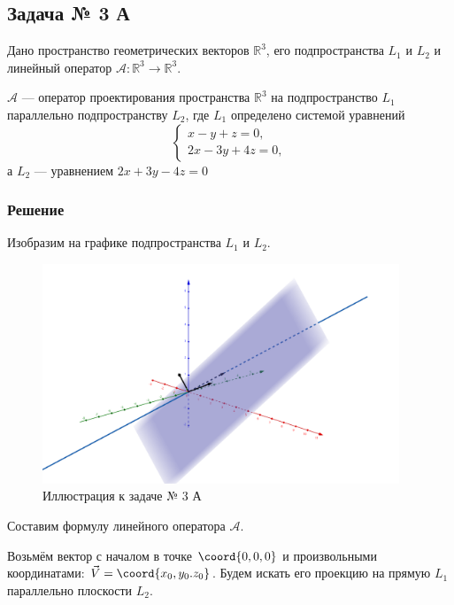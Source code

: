 \subsection{Задача № 3 А}

\newcommand{\mRRR}{\mathbb{R}^3}
\newcommand{\opA}{\mathcal{A}}
\newcommand{\matA}{\mathrm{A}}
\newcommand{\matP}{\mathrm{P}}


Дано пространство геометрических векторов \(\mRRR\),
его подпространства \(L_1\) и \(L_2\) и линейный оператор
\(\opA : \mRRR \to \mRRR\).

\(\opA\) --- оператор проектирования пространства \(\mRRR\)
на подпространство \(L_1\) параллельно подпространству \(L_2\),
где \(L_1\) определено системой уравнений
\[
  \begin{cases}
    x - y + z = 0, \\
    2x - 3y + 4z = 0,
  \end{cases}
\]
а \(L_2\) --- уравнением \(2x + 3y - 4z=0\)

\subsubsection{Решение}

Изобразим на графике подпространства \(L_1\) и \(L_2\).

\begin{figure}[!htbp]
  \centering
  \includegraphics[width=0.95\textwidth]{./img/03-a-1.png}
  \caption{Иллюстрация к задаче № 3 А}
\end{figure}

Составим формулу линейного оператора \(\opA\).

Возьмём вектор с началом в точке \(\coord{0, 0, 0}\)
и произвольными координатами: \(\vec{V} = \coord{x_0, y_0. z_0}\).
Будем искать его проекцию на прямую \(L_1\)
параллельно плоскости \(L_2\).

